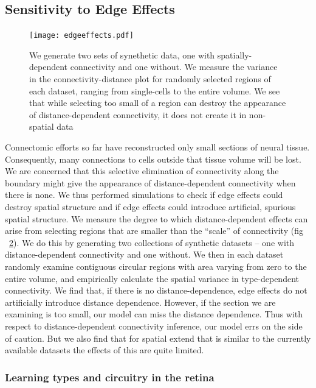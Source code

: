 \documentclass{article}
\begin{document}
{\begin{figure}
  \label{fig:othermodel}
\end{figure}



\subsection*{Sensitivity to Edge Effects} 

\begin{figure}
  \centering 
  \centerline{\texttt{[image: edgeeffects.pdf]}}
  \caption{We generate two sets of synethetic data, one with
    spatially-dependent connectivity and one without. We measure the
    variance in the connectivity-distance plot for randomly selected
    regions of each dataset, ranging from single-cells to the entire
    volume. We see that while selecting too small of a region can 
    destroy the appearance of distance-dependent connectivity, 
    it does not create it in non-spatial data}
\label{fig:edgeeffects}
\end{figure}

Connectomic efforts so far have reconstructed only small sections of
neural tissue. Consequently, many connections to cells outside that tissue
volume will be lost. We are concerned that this selective elimination
of connectivity along the boundary might give the appearance of
distance-dependent connectivity when there is none. We thus performed
simulations to check if edge effects could destroy spatial structure
and if edge effects could introduce artificial, spurious spatial
structure. We measure the degree to which distance-dependent effects
can arise from selecting regions that are smaller than the ``scale''
of connectivity (fig ~\ref{fig:edgeeffects}). We do this by generating
two collections of synthetic datasets -- one with distance-dependent
connectivity and one without.  We then in each dataset randomly
examine contiguous circular regions with area varying from zero to the
entire volume, and empirically calculate the spatial variance in
type-dependent connectivity.  We find that, if there is no
distance-dependence, edge effects do not artificially introduce
distance dependence. However, if the section we are examining is too
small, our model can miss the distance dependence. Thus with respect
to distance-dependent connectivity inference, our model errs on the
side of caution. But we also find that for spatial extend that is
similar to the currently available datasets the effects of this are
quite limited.

\subsubsection*{Learning types and circuitry in the retina}

}
\end{document}
